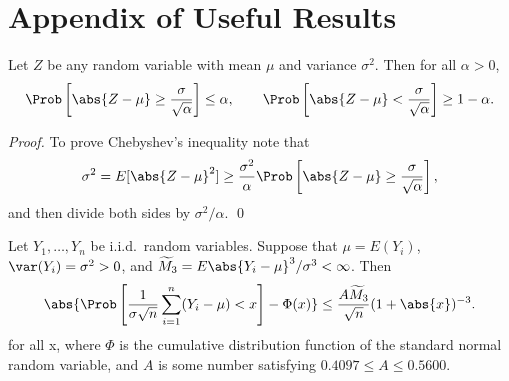\documentclass[graybox]{svmult}
\begin{document}
\section{Appendix of Useful Results}
\begin{theorem} \label{Chebineqthm} Let $Z$ be any random variable with mean $\mu$ and variance $\sigma^2$.  Then for all $\alpha >0$,
\[
\Prob\left[\abs{Z-\mu} \ge \frac{\sigma}{\sqrt{\alpha}} \right] \le \alpha, \qquad \Prob\left[\abs{Z-\mu} < \frac{\sigma}{\sqrt{\alpha}} \right] \ge 1-\alpha.
\]
\end{theorem}
\begin{proof}To prove Chebyshev's inequality note that
\begin{equation*}
\sigma^2 = E[\abs{Z-\mu}^2] \ge \frac{\sigma^2}{\alpha} \Prob\left[\abs{Z-\mu} \ge \frac{\sigma}{\sqrt{\alpha}} \right],
\end{equation*}
and then divide both sides by $\sigma^2/\alpha$. \qed
\end{proof}
\begin{theorem} \cite[Theorem 5.16, p. 168]{Pet95a} \label{BE} Let $Y_1,\dots,Y_n$ be i.i.d.\ random variables.  Suppose that
$\mu=E(Y_i)$, $\var(Y_i)=\sigma^2>0$,  and $\widetilde{M}_3=E\abs{Y_i - \mu}^3/\sigma^3 < \infty$.
Then
\[
\abs{\Prob\left[\frac{1}{\sigma\sqrt{n}}\sum_{i=1}^{n}(Y_i-\mu)<x
\right]-\Phi(x)}\leq \frac{A \widetilde{M}_3}{\sqrt{n}}(1+\abs{x})^{-3}.
\] for all x,
where $\Phi$ is the cumulative distribution function of the standard normal random variable, and $A$ is some number satisfying $0.4097\leq A\leq 0.5600$.
\end{theorem}
\end{document}
